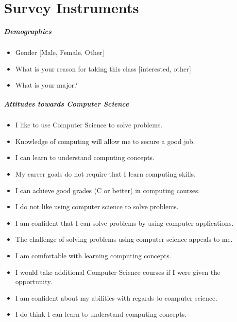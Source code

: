 \chapter*{Survey Instruments}
\label{surveyInstrument}

\paragraph * {Demographics}\mbox{} 
\begin{itemize}
\item Gender [Male, Female, Other]
\item What is your reason for taking this class [interested, other]
\item What is your major?
\end{itemize}

\paragraph * {Attitudes towards Computer Science}\mbox{}
\begin{itemize}
\item I like to use Computer Science to solve problems.
\item Knowledge of computing will allow me to secure a good job.
\item I can learn to understand computing concepts.
\item My career goals do not require that I learn computing skills.
\item I can achieve good grades (C or better) in computing courses.
\item I do not like using computer science to solve problems.
\item I am confident that I can solve problems by using computer applications.
\item The challenge of solving problems using computer science appeals to me.
\item I am comfortable with learning computing concepts.
\item I would take additional Computer Science courses if I were given the opportunity.
\item I am confident about my abilities with regards to computer science.
\item I do think I can learn to understand computing concepts.
\end{itemize}

